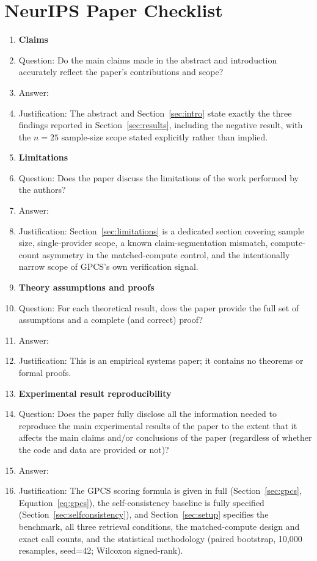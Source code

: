 \section*{NeurIPS Paper Checklist}

\begin{enumerate}

\item {\bf Claims}
    \item[] Question: Do the main claims made in the abstract and introduction accurately reflect the paper's contributions and scope?
    \item[] Answer: \answerYes{}
    \item[] Justification: The abstract and Section~\ref{sec:intro} state exactly the three findings reported in Section~\ref{sec:results}, including the negative result, with the $n=25$ sample-size scope stated explicitly rather than implied.

\item {\bf Limitations}
    \item[] Question: Does the paper discuss the limitations of the work performed by the authors?
    \item[] Answer: \answerYes{}
    \item[] Justification: Section~\ref{sec:limitations} is a dedicated section covering sample size, single-provider scope, a known claim-segmentation mismatch, compute-count asymmetry in the matched-compute control, and the intentionally narrow scope of GPCS's own verification signal.

\item {\bf Theory assumptions and proofs}
    \item[] Question: For each theoretical result, does the paper provide the full set of assumptions and a complete (and correct) proof?
    \item[] Answer: \answerNA{}
    \item[] Justification: This is an empirical systems paper; it contains no theorems or formal proofs.

\item {\bf Experimental result reproducibility}
    \item[] Question: Does the paper fully disclose all the information needed to reproduce the main experimental results of the paper to the extent that it affects the main claims and/or conclusions of the paper (regardless of whether the code and data are provided or not)?
    \item[] Answer: \answerYes{}
    \item[] Justification: The GPCS scoring formula is given in full (Section~\ref{sec:gpcs}, Equation~\ref{eq:gpcs}), the self-consistency baseline is fully specified (Section~\ref{sec:selfconsistency}), and Section~\ref{sec:setup} specifies the benchmark, all three retrieval conditions, the matched-compute design and exact call counts, and the statistical methodology (paired bootstrap, 10{,}000 resamples, seed=42; Wilcoxon signed-rank).


\end{enumerate}
